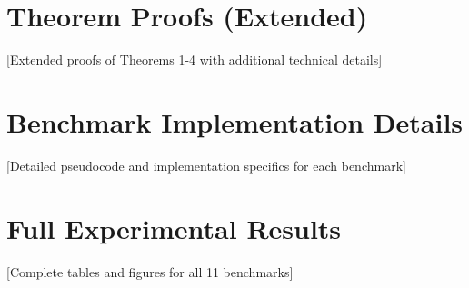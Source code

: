 \documentclass[11pt,letterpaper]{article}
\begin{document}
\appendix

\section{Theorem Proofs (Extended)}

[Extended proofs of Theorems 1-4 with additional technical details]

\section{Benchmark Implementation Details}

[Detailed pseudocode and implementation specifics for each benchmark]

\section{Full Experimental Results}

[Complete tables and figures for all 11 benchmarks]
\end{document}
